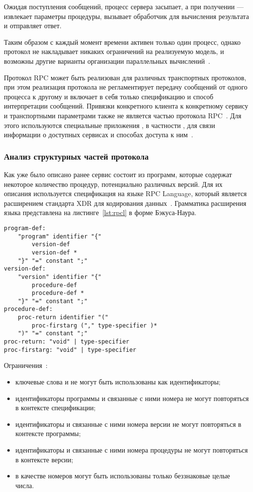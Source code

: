 Ожидая поступления сообщений, процесс сервера засыпает, а при получении ---
извлекает параметры процедуры, вызывает обработчик для вычисления результата и
отправляет ответ.

Таким образом с каждый момент времени активен только один процесс, однако
протокол не накладывает никаких ограничений на реализуемую модель, и возможны
другие варианты организации параллельных вычислений~\cite{rfc5531}.

Протокол RPC может быть реализован для различных транспортных протоколов, при
этом реализация протокола не регламентирует передачу сообщений от одного
процесса к другому и включает в себя только спецификацию и способ интерпретации
сообщений. Привязки конкретного клиента к конкретному сервису и транспортными
параметрами также не является частью протокола RPC~\cite{rfc5531}. Для этого
используются специальные приложения , в частности
, для связи информации о доступных сервисах и способах доступа к
ним~\cite{rfc1833}.

\subsubsection{Анализ структурных частей протокола}

Как уже было описано ранее сервис состоит из программ, которые содержат
некоторое количество процедур, потенциально различных версий. Для их описания
используется спецификация на языке RPC Language, который является расширением
стандарта XDR для кодирования данных~\mbox{\cite{rfc5531}\cite{rfc4506}}.
Грамматика расширения языка представлена на листинге~\ref{lst:rpcl} в
форме Бэкуса-Наура.

\begin{lstlisting}[caption={Структура RPCL}, label={lst:rpcl}]
program-def:
    "program" identifier "{"
        version-def
        version-def *
    "}" "=" constant ";"
version-def:
    "version" identifier "{"
        procedure-def
        procedure-def *
    "}" "=" constant ";"
procedure-def:
    proc-return identifier "("
        proc-firstarg ("," type-specifier )*
    ")" "=" constant ";"
proc-return: "void" | type-specifier
proc-firstarg: "void" | type-specifier
\end{lstlisting}

Ограничения~\cite{rfc5531}:
\begin{itemize}
    \item ключевые слова  и  не могут быть
          использованы как идентификаторы;
    \item идентификаторы программы и связанные с ними номера не могут
          повторяться в контексте спецификации;
    \item идентификаторы и связанные с ними номера версии не могут
          повторяться в контексте программы;
    \item идентификаторы и связанные с ними номера процедуры не могут
          повторяться в контексте версии;
    \item в качестве номеров могут быть использованы только беззнаковые
          целые числа.
\end{itemize}

